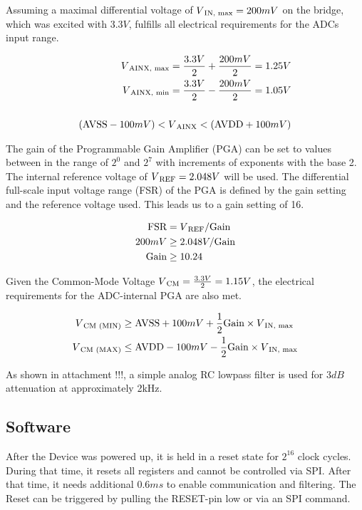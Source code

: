 Assuming a maximal differential voltage of $V\textsubscript{IN, max} = 200mV$ on the bridge, which was excited with $3.3V$, fulfills all electrical requirements for the ADCs input range.

\begin{equation}
\begin{split}
V\textsubscript{AINX, max} = \frac{3.3V}{2} + \frac{200mV}{2} = 1.25V\\
V\textsubscript{AINX, min} = \frac{3.3V}{2} - \frac{200mV}{2} = 1.05V\\\\
(\mbox{AVSS} - 100mV) < V\textsubscript{AINX} < (\mbox{AVDD} + 100mV)
\end{split}
\end{equation}

The gain of the Programmable Gain Amplifier (PGA) can be set to values between in the range of $2^0$ and $2^7$ with increments of exponents with the base 2. The internal reference voltage of $V\textsubscript{REF} = 2.048V$ will be used. The differential full-scale input voltage range (FSR) of the PGA is defined by the gain setting and the reference voltage used. This leads us to a gain setting of 16.

\begin{equation}
\begin{split}
\mbox{FSR} &= V\textsubscript{REF} / \mbox{Gain}\\
200mV &\geq 2.048V / \mbox{Gain} \\
\mbox{Gain} &\geq 10.24
\end{split}
\end{equation}

Given the Common-Mode Voltage $V\textsubscript{CM} = \frac{3.3V}{2} = 1.15V$, the electrical requirements for the ADC-internal PGA are also met.

\begin{equation}
\begin{split}
V\textsubscript{CM (MIN)} &\geq \mbox{AVSS} + 100mV + \frac{1}{2} \mbox{Gain} \times V\textsubscript{IN, max} \\
V\textsubscript{CM (MAX)} &\leq \mbox{AVDD} - 100mV - \frac{1}{2} \mbox{Gain} \times V\textsubscript{IN, max}
\end{split}
\end{equation}

As shown in attachment !!!, a simple analog RC lowpass filter is used for $3dB$ attenuation at approximately 2kHz.


\subsection{Software}
After the Device was powered up, it is held in a reset state for $2^{16}$ clock cycles. During that time, it resets all registers and cannot be controlled via SPI. After that time, it needs additional $0.6ms$ to enable communication and filtering. The Reset can be triggered by pulling the RESET-pin low or via an SPI command.

